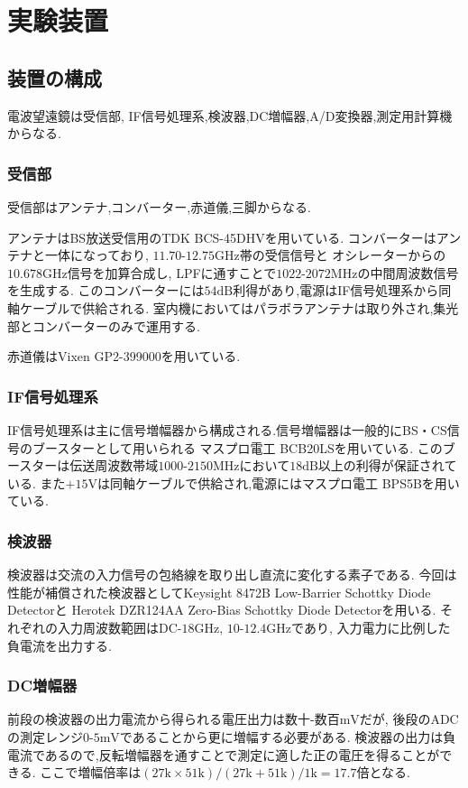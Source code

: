 \section{実験装置}
\subsection{装置の構成}
電波望遠鏡は受信部, IF信号処理系,検波器,DC増幅器,A/D変換器,測定用計算機からなる.
\subsubsection{受信部}
受信部はアンテナ,コンバーター,赤道儀,三脚からなる.

アンテナはBS放送受信用のTDK BCS-45DHVを用いている.
コンバーターはアンテナと一体になっており, $11.70$-$12.75\si{\giga\hertz}$帯の受信信号と
オシレーターからの$10.678\si{\giga\hertz}$信号を加算合成し,
LPFに通すことで$1022$-$2072\si{\mega\hertz}$の中間周波数信号を生成する.
このコンバーターには$54\si{\deci\bel}$利得があり,電源はIF信号処理系から同軸ケーブルで供給される.
室内機においてはパラボラアンテナは取り外され,集光部とコンバーターのみで運用する.

赤道儀はVixen GP2-399000を用いている.
\subsubsection{IF信号処理系}
IF信号処理系は主に信号増幅器から構成される.信号増幅器は一般的にBS・CS信号のブースターとして用いられる
マスプロ電工 BCB20LSを用いている.
このブースターは伝送周波数帯域$1000$-$2150\si{\mega\hertz}$において$18\si{\deci\bel}$以上の利得が保証されている.
また$+15\si{\volt}$は同軸ケーブルで供給され,電源にはマスプロ電工 BPS5Bを用いている.
\subsubsection{検波器}
検波器は交流の入力信号の包絡線を取り出し直流に変化する素子である.
今回は性能が補償された検波器としてKeysight 8472B Low-Barrier Schottky Diode Detectorと
Herotek DZR124AA Zero-Bias Schottky Diode Detectorを用いる.
それぞれの入力周波数範囲はDC-$18\si{\giga\hertz}$, $10$-$12.4\si{\giga\hertz}$であり,
入力電力に比例した負電流を出力する.
\subsubsection{DC増幅器}
前段の検波器の出力電流から得られる電圧出力は数十-数百$\si{\milli\volt}$だが,
後段のADCの測定レンジ$0$-$5\si{\milli\volt}$であることから更に増幅する必要がある.
検波器の出力は負電流であるので,反転増幅器を通すことで測定に適した正の電圧を得ることができる.
ここで増幅倍率は$(27\si{\kilo}\times51\si{\kilo})/(27\si{\kilo}+51\si{\kilo})/1\si{\kilo}=17.7$倍となる.
